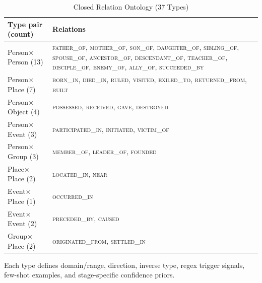 \begin{table}[!t]
\caption{Closed Relation Ontology (37 Types)}
\label{tab:ontology}
\centering
\begin{threeparttable}
\begin{tabular}{p{2.35cm}p{5.6cm}}
\toprule
Type pair (count) & Relations \\
\midrule
Person$\times$Person (13) & \textsc{father\_of, mother\_of, son\_of,
daughter\_of, sibling\_of, spouse\_of, ancestor\_of, descendant\_of,
teacher\_of, disciple\_of, enemy\_of, ally\_of, succeeded\_by} \\
Person$\times$Place (7) & \textsc{born\_in, died\_in, ruled, visited,
exiled\_to, returned\_from, built} \\
Person$\times$Object (4) & \textsc{possessed, received, gave, destroyed} \\
Person$\times$Event (3) & \textsc{participated\_in, initiated,
victim\_of} \\
Person$\times$Group (3) & \textsc{member\_of, leader\_of, founded} \\
Place$\times$Place (2) & \textsc{located\_in, near} \\
Event$\times$Place (1) & \textsc{occurred\_in} \\
Event$\times$Event (2) & \textsc{preceded\_by, caused} \\
Group$\times$Place (2) & \textsc{originated\_from, settled\_in} \\
\bottomrule
\end{tabular}
\begin{tablenotes}\footnotesize
\item Each type defines domain/range, direction, inverse type, regex
trigger signals, few-shot examples, and stage-specific confidence priors.
\end{tablenotes}
\end{threeparttable}
\end{table}

